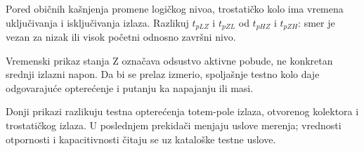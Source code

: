 Pored običnih kašnjenja promene logičkog nivoa, trostatičko kolo ima vremena uključivanja i isključivanja izlaza. Razlikuj $t_{pLZ}$ i $t_{pZL}$ od $t_{pHZ}$ i $t_{pZH}$: smer je vezan za nizak ili visok početni odnosno završni nivo.

Vremenski prikaz stanja Z označava odsustvo aktivne pobude, ne konkretan srednji izlazni napon. Da bi se prelaz izmerio, spoljašnje testno kolo daje odgovarajuće opterećenje i putanju ka napajanju ili masi.

Donji prikazi razlikuju testna opterećenja totem-pole izlaza, otvorenog kolektora i trostatičkog izlaza. U poslednjem prekidači menjaju uslove merenja; vrednosti otpornosti i kapacitivnosti čitaju se uz kataloške testne uslove.

